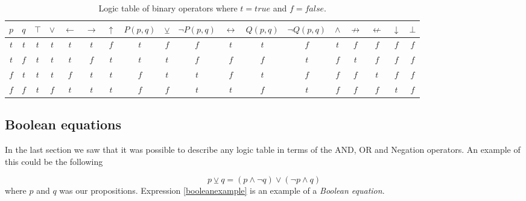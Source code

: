                 \begin{table}[h!]
                    \centering
                    \begin{tabular}{|c|c||c|c|c|c|c|c|c|c|c|c|c|c|c|c|c|c|}
                    	\hline
                    	$p$ & $q$ & $\top$ & $\vee$ & $\leftarrow$ & $\rightarrow$ & $\uparrow$ & $P(p,q)$ & $\veebar$ & $\neg P(p,q)$ & $\leftrightarrow$ & $Q(p, q)$ & $\neg Q(p,q)$ & $\wedge$ & $\not\rightarrow$ & $\not\leftarrow$ & $\downarrow$ & $\bot$ \\ \hline
                    	$t$ & $t$ &  $t$   &  $t$   &     $t$      &      $t$      &    $f$     &   $t$    &    $f$    &      $f$      &        $t$        &    $t$    &      $f$      &   $t$    &        $f$        &       $f$        &     $f$      &  $f$   \\ \hline
                    	$t$ & $f$ &  $t$   &  $t$   &     $t$      &      $f$      &    $t$     &   $t$    &    $t$    &      $f$      &        $f$        &    $f$    &      $t$      &   $f$    &        $t$        &       $f$        &     $f$      &  $f$   \\ \hline
                    	$f$ & $t$ &  $t$   &  $t$   &     $f$      &      $t$      &    $t$     &   $f$    &    $t$    &      $t$      &        $f$        &    $t$    &      $f$      &   $f$    &        $f$        &       $t$        &     $f$      &  $f$   \\ \hline
                    	$f$ & $f$ &  $t$   &  $f$   &     $t$      &      $t$      &    $t$     &   $f$    &    $f$    &      $t$      &        $t$        &    $f$    &      $t$      &   $f$    &        $f$        &       $f$        &     $t$      &  $f$   \\ \hline
                    \end{tabular} 
                    \caption{Logic table of binary operators where $t=true$ and $f=false$.} 
                    \label{LogicTable:BinaryOperators}
                \end{table}
        
        \subsection{Boolean equations}
            In the last section we saw that it was possible to describe any logic table in terms of the AND, OR and Negation operators. An example of this could be the following
            
            \begin{equation}
                \label{booleanexample}
                p \veebar q = (p \wedge \neg q) \vee (\neg p \wedge q)
            \end{equation}
            where $p$ and $q$ was our propositions. Expression \ref{booleanexample} is an example of a \textit{Boolean equation}. 
            
